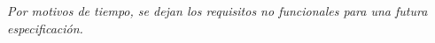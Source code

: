 \begin{center}
\textit{Por motivos de tiempo, se dejan los requisitos no funcionales para una futura especificación.}
\end{center}